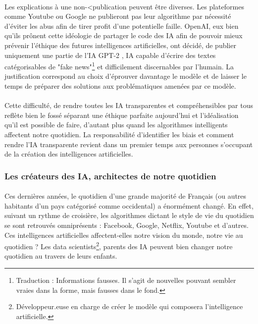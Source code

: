 \documentclass[10pt, french, a4paper]{report}
\begin{document}
\paragraph{}
Les explications à une non-<publication peuvent être diverses. Les plateformes comme Youtube ou Google ne publieront pas leur algorithme par nécessité d’éviter les abus afin de tirer profit d’une potentielle faille. OpenAI, eux bien qu’ils prônent cette idéologie de partager le code des IA afin de pouvoir mieux prévenir l’éthique des futures intelligences artificielles, ont décidé, de publier uniquement une partie de l’IA GPT-2 \citep{radford_language_2019}, IA capable d’écrire des textes catégorisables de "fake news"\footnote{Traduction : Informations fausses. Il s’agit de nouvelles pouvant sembler vraies dans la forme, mais fausses dans le fond.} et difficilement discernables par l’humain. La justification correspond au choix d’éprouver davantage le modèle et de laisser le temps de préparer des solutions aux problématiques amenées par ce modèle.

\paragraph{}
Cette difficulté, de rendre toutes les IA transparentes et compréhensibles par tous reflète bien le fossé séparant une éthique parfaite aujourd’hui et l’idéalisation qu’il est possible de faire, d’autant plus quand les algorithmes intelligents affectent notre quotidien. La responsabilité d’identifier les biais et comment rendre l’IA transparente revient dans un premier temps aux personnes s’occupant de la création des intelligences artificielles.

\subsubsection{Les créateurs des IA, architectes de notre quotidien}

\paragraph{}
Ces dernières années, le quotidien d’une grande majorité de Français (ou autres habitants d’un pays catégorisé comme occidental) a énormément changé. En effet, suivant un rythme de croisière, les algorithmes dictant le style de vie du quotidien se sont retrouvés omniprésents : Facebook, Google, Netflix, Youtube et d’autres. Ces intelligences artificielles affectent-elles notre vision du monde, notre vie au quotidien ? Les data scientists\footnote{Développeur.euse en charge de créer le modèle qui composera l’intelligence artificielle.}, parents des IA peuvent bien changer notre quotidien au travers de leurs enfants.
\end{document}
